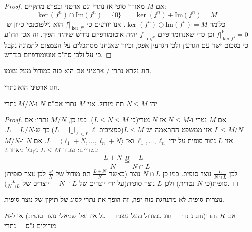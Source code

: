 \documentclass{tstextbook}
\begin{document}
\begin{proof}
אם \(M\) מאורך סופי אז נתרי וגם ארטני ובפרט מתקיים:
$$\ker (f^{n})\cap \mathrm{\mathrm{Im}}(f^{n})=\{ 0 \}\qquad \ker (f^{n})+\mathrm{Im}(f^{n})=M$$
כלומר \(\ker (f^{n})\oplus \mathrm{\mathrm{Im}}(f^{n})=M\). 
אנו יודעים כי \(f|_{\ker f^{n}}\) הוא נילפוטנטי כיוון ש-\(f|_{\ker f^{k}}^{k}=0\) וכן כדי שאנדומרופיזם \(f|_{\mathrm{Im}f^{k}}\) יהיה אוטומורפיזם נדרש שיהיה הפיך. זה אכן חח"ע כי בסכום ישר עם הגרעין ולכן הגרעין אפס, וכיוון שאנחנו מסתכלים על הצמצום לתמונה נקבל כי על ולכן סה"כ אוטומורפיזם כנדרש.

\end{proof}
\begin{definition}
חוג נקרא נתרי / ארטיני אם הוא כזה כמודול מעל עצמו.

\end{definition}
\begin{theorem}
חוג ארטיני הוא נתרי.

\end{theorem}
\begin{proposition}
יהי \(N\leq M\) תת מודול. אזי \(M\) נתרי אם"ם \(N\) ו-\(M / N\) נתרי

\end{proposition}
\begin{proof}
אם \(M\) נטרי ו-\(N\leq M\) אז \(N\) נטרי(כי \(L\leq N \leq M\)). כמו כן, \(M / N\) נתרי:
אם \(L\leq M / N\) אזי ממשפט ההתאמה יש \(\overline{L}\leq M\)(ספציבית \(\overline{L}=\bigcup_{\ell \in L}\ell\)) כך ש-\(L = L / N\). אזי \(\overline{L}\) נוצר סופית על ידי \(\ell_{1},\dots,\ell_{n}\) ואז \(L=\langle \ell_{1}+N, \dots,\ell_{n}+N \rangle\).
אם \(N\) ו-\(M / N\) נטריים:
עבור \(L\leq M\) נקבל מאיזו 2:
$$\frac{L+N}{N}\overset{II}{\cong } \frac{L}{N\cap  L}$$
(כאשר \(\frac{L+N}{N}\) תת מודול של \(\frac{M}{ N}\) לכן נוצר סופית) לכן \(\frac{L}{N \cap L}\) נוצר סופית. כמו כן \(N\cap L\) נוצר סופית(כי \(N\) נטרית) ולכן \(L\) נוצר סופית(על ידי יוצרים של \(N\cap L\) + יוצרים של \(\frac{L}{N\cap L}\)).

\end{proof}
\begin{remark}
נוצרות סופית לא מתנהגת כזה יפה, זה הופך את נתרי לסוג של תיקון של נוצר סופית.

\end{remark}
\begin{corollary}
אם \(R\) נתרי(חוג נתרי = חוג כמודול מעל עצמו = כל אידיאל שמאלי נוצר סופית) אז ל-\(R\) מודולים נ"ס = נתרי

\end{corollary}
\end{document}
